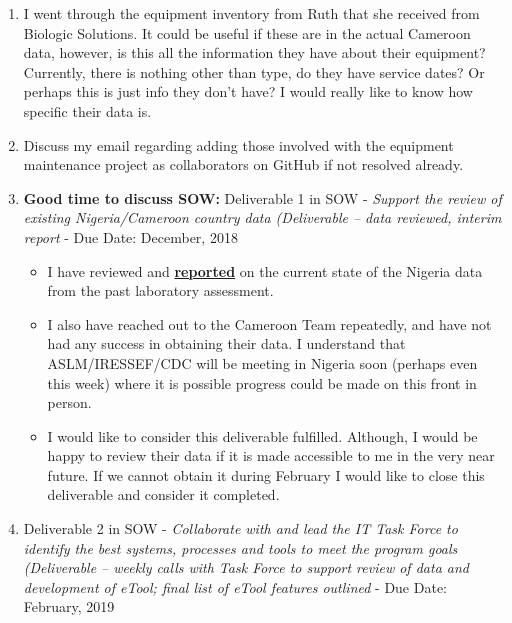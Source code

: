 \documentclass[]{article}
\providecommand{\tightlist}{%
  \setlength{\itemsep}{0pt}\setlength{\parskip}{0pt}}
\begin{document}
\begin{enumerate}
\def\labelenumi{\arabic{enumi}.}
\tightlist
\item
  I went through the equipment inventory from Ruth that she received
  from Biologic Solutions. It could be useful if these are in the actual
  Cameroon data, however, is this all the information they have about
  their equipment? Currently, there is nothing other than type, do they
  have service dates? Or perhaps this is just info they don't have? I
  would really like to know how specific their data is.
\item
  Discuss my email regarding adding those involved with the equipment
  maintenance project as collaborators on GitHub if not resolved
  already.
\item
  \textbf{Good time to discuss SOW:} Deliverable 1 in SOW -
  \emph{Support the review of existing Nigeria/Cameroon country data
  (Deliverable -- data reviewed, interim report} - Due Date: December,
  2018

  \begin{itemize}
  \tightlist
  \item
    I have reviewed and
    \textbf{\href{https://github.com/paceafenet/etool_dev/blob/master/existing_lab_data_exploration.md}{reported}}
    on the current state of the Nigeria data from the past laboratory
    assessment.
  \item
    I also have reached out to the Cameroon Team repeatedly, and have
    not had any success in obtaining their data. I understand that
    ASLM/IRESSEF/CDC will be meeting in Nigeria soon (perhaps even this
    week) where it is possible progress could be made on this front in
    person.
  \item
    I would like to consider this deliverable fulfilled. Although, I
    would be happy to review their data if it is made accessible to me
    in the very near future. If we cannot obtain it during February I
    would like to close this deliverable and consider it completed.
  \end{itemize}
\item
  Deliverable 2 in SOW - \emph{Collaborate with and lead the IT Task
  Force to identify the best systems, processes and tools to meet the
  program goals (Deliverable -- weekly calls with Task Force to support
  review of data and development of eTool; final list of eTool features
  outlined} - Due Date: February, 2019


\end{enumerate}
\end{document}
